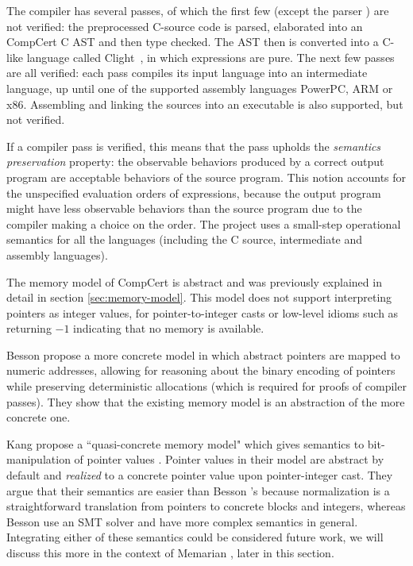 The compiler has several passes, of which the first few (except the parser \cite{jourdan2012validating}) are not verified:
the preprocessed C-source code is parsed, elaborated into an CompCert C AST and then type checked.
The AST then is converted into a C-like language called Clight~\cite{blazy2009mechanized}, in which  expressions are pure. The next few passes are all verified: each pass compiles its input language into an
intermediate language, up until one of the supported assembly languages PowerPC, ARM or x86.
Assembling and linking the sources into an executable is also supported, but not verified.

If a compiler pass is verified, this means that the pass upholds the \textit{semantics preservation} property:
the observable behaviors produced by a correct output program are acceptable behaviors of the source program.
This notion accounts for the unspecified evaluation orders of expressions, because
the output program might have less observable behaviors than the source program due to the compiler making a choice on the order.  
The project uses a small-step operational semantics for all the languages (including the C source, intermediate and assembly
languages).

The memory model of CompCert is abstract and was previously explained in detail in section \ref{sec:memory-model}.
This model does not support interpreting pointers as integer values, \eg for pointer-to-integer casts
or low-level idioms such as  returning $-1$ indicating that no memory is available.

Besson \etall propose a more concrete model in which abstract pointers are mapped to numeric addresses, allowing for reasoning about
the binary encoding of pointers \cite{besson2015concrete} while preserving deterministic allocations (which is required for proofs of compiler passes).
They show that the existing memory model is an abstraction of the more concrete one.

Kang \etall propose a ``quasi-concrete memory model" which gives semantics to bit-manipulation of pointer values \cite{kang2015formal}.
Pointer values in their model are abstract by default and \textit{realized} to a concrete pointer value upon pointer-integer cast. 
They argue that their semantics are easier than Besson \etall's because normalization is a straightforward
translation from pointers to concrete blocks and integers, whereas Besson \etall use an SMT solver and have
more complex semantics in general.
Integrating either of these semantics could be considered future work,
we will discuss this more in the context of Memarian \etall \cite{memarian2019exploring}, later in this section.

